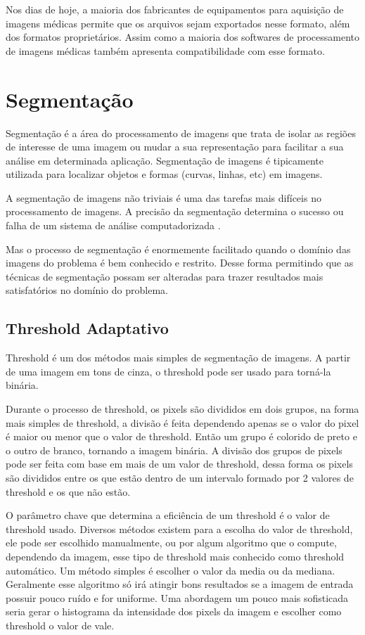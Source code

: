 Nos dias de hoje, a maioria dos fabricantes de equipamentos para aquisição de imagens médicas permite que os arquivos sejam exportados nesse formato, além dos formatos proprietários. Assim como a maioria dos softwares de processamento de imagens médicas também apresenta compatibilidade com esse formato.

\section{Segmentação}

Segmentação é a área do processamento de imagens que trata de isolar as regiões de interesse de uma imagem ou mudar a sua representação para facilitar a sua análise em determinada aplicação. Segmentação de imagens é tipicamente utilizada para localizar objetos e formas (curvas, linhas, etc) em imagens.

A segmentação de imagens não triviais é uma das tarefas mais difíceis no processamento de imagens. A precisão da segmentação determina o sucesso ou falha de um sistema de análise computadorizada \cite{gonzalez}.

Mas o processo de segmentação é enormemente facilitado quando o domínio das imagens do problema é bem conhecido e restrito. Desse forma permitindo que as técnicas de segmentação possam ser alteradas para trazer resultados mais satisfatórios no domínio do problema.

\subsection{Threshold Adaptativo}
\label{subsec:threshold}

Threshold é um dos métodos mais simples de segmentação de imagens. A partir de uma imagem em tons de cinza, o threshold pode ser usado para torná-la binária.

Durante o processo de threshold, os pixels são divididos em dois grupos, na forma mais simples de threshold, a divisão é feita dependendo apenas se o valor do pixel é maior ou menor que o valor de threshold. Então um grupo é colorido de preto e o outro de branco, tornando a imagem binária. A divisão dos grupos de pixels pode ser feita com base em mais de um valor de threshold, dessa forma os pixels são divididos entre os que estão dentro de um intervalo formado por 2 valores de threshold e os que não estão.

O parâmetro chave que determina a eficiência de um threshold é o valor de threshold usado. Diversos métodos existem para a escolha do valor de threshold, ele pode ser escolhido manualmente, ou por algum algoritmo que o compute, dependendo da imagem, esse tipo de threshold mais conhecido como threshold automático. Um método simples é escolher o valor da media ou da mediana. Geralmente esse algoritmo só irá atingir bons resultados se a imagem de entrada possuir pouco ruído e for uniforme. Uma abordagem um pouco mais sofisticada seria gerar o histograma da intensidade dos pixels da imagem e escolher como threshold o valor de vale.


